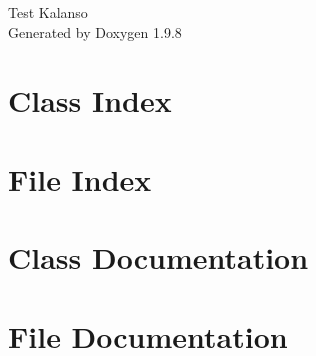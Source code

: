 \documentclass[twoside]{book}
\newcommand{\+}{\discretionary{\mbox{\scriptsize$\hookleftarrow$}}{}{}}
\newcommand{\clearemptydoublepage}{%
    \newpage{\pagestyle{empty}\cleardoublepage}%
  }
\begin{document}
  \raggedbottom
    \hypersetup{pageanchor=false,
                bookmarksnumbered=true,
                pdfencoding=unicode
               }
  \begin{titlepage}
  \vspace*{7cm}
  \begin{center}%
  {\Large Test Kalanso}\\
  \vspace*{1cm}
  {\large Generated by Doxygen 1.9.8}\\
  \end{center}
  \end{titlepage}
  \clearemptydoublepage
  \tableofcontents
  \clearemptydoublepage
  \hypersetup{pageanchor=true}
\chapter{Class Index}

\chapter{File Index}

\chapter{Class Documentation}






















\chapter{File Documentation}














  \backmatter
  \newpage
  \clearemptydoublepage
  \printindex
\end{document}
